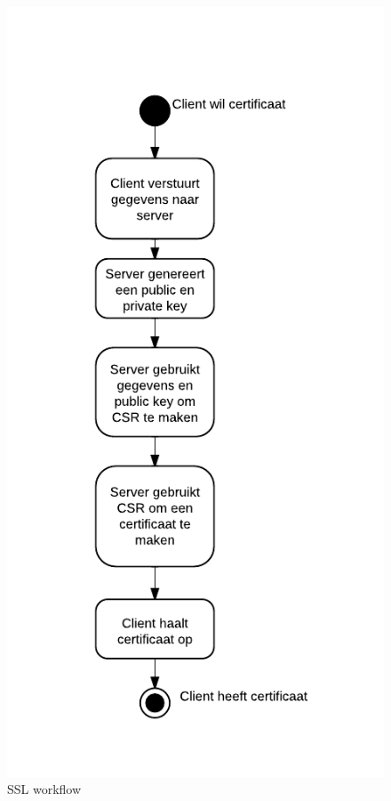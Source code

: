 \documentclass[]{article}
\begin{document}
\newpage
\begin{figure}
  \begin{center}
    \includegraphics[height=0.62\textheight]{ssl_ad_1.pdf}
  \end{center}
  \caption{SSL workflow}
  \label{ssl_ad_1}
\end{figure}
\end{document}
